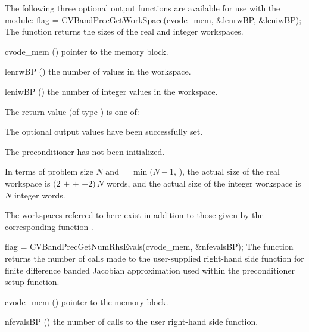 \noindent The following three optional output functions are available for use with 
the {\cvbandpre} module:
{
  flag = CVBandPrecGetWorkSpace(cvode\_mem, \&lenrwBP, \&leniwBP);
}
{
  The function  returns the sizes of
  the {\cvbandpre} real and integer workspaces.
}
{
  \begin{args}
  \item[cvode\_mem] ()
    pointer to the {\cvodes} memory block.
  \item[lenrwBP] ()
    the number of  values in the {\cvbandpre} workspace.
  \item[leniwBP] ()
    the number of integer values in the {\cvbandpre} workspace.
  \end{args}
}
{
  The return value  (of type ) is one of:
  \begin{args}
  \item[\Id{CVSPILS\_SUCCESS}] 
    The optional output values have been successfully set.
  \item[\Id{CVSPILS\_PMEM\_NULL}]
    The {\cvbandpre} preconditioner has not been initialized.
  \end{args}
}
{
  In terms of problem size $N$ and  = $\min(N-1,\,$),
  the actual size of the real workspace is
  $(2$  $+$  $+$  $+2)\, N$  words,
  and the actual size of the integer workspace is $N$ integer words.

  The workspaces referred to here exist in addition to those given by the
  corresponding function .
}
{
  flag = CVBandPrecGetNumRhsEvals(cvode\_mem, \&nfevalsBP);
}
{
  The function  returns the
  number of calls made to the user-supplied right-hand side function for
  finite difference banded Jacobian approximation used within
  the preconditioner setup function.
}
{
  \begin{args}[nfevalsBP]
  \item[cvode\_mem] ()
    pointer to the {\cvodes} memory block.
  \item[nfevalsBP] ()
    the number of calls to the user right-hand side function.
  \end{args}
}
